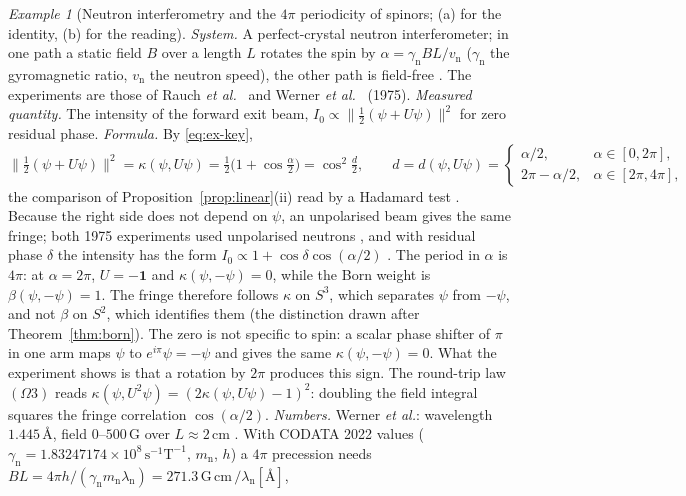 \documentclass[aps,pra,onecolumn,superscriptaddress,nofootinbib,10pt]{revtex4-2}
\theoremstyle{definition}
\theoremstyle{remark}
\newtheorem{example}[theorem]{Example}
\begin{document}
\begin{example}[Neutron interferometry and the $4\pi$ periodicity of spinors; (a) for the identity, (b) for the reading]\label{ex:neutron}
\emph{System.}  A perfect-crystal neutron interferometer; in one path a static field $B$ over a length
$L$ rotates the spin by $\alpha=\gamma_{\mathrm n}BL/v_{\mathrm n}$ ($\gamma_{\mathrm n}$ the gyromagnetic ratio, $v_{\mathrm n}$ the
neutron speed), the other path is field-free \cite{ex-AS67,ex-Bernstein67}.  The experiments are those of
Rauch \emph{et al.}\ \cite{ex-Rauch75} and Werner \emph{et al.}\ \cite{ex-WCOE75} (1975).
\emph{Measured quantity.}  The intensity of the forward exit beam, $I_0\propto\lVert\tfrac12(\psi+U\psi)\rVert^2$ for
zero residual phase.
\emph{Formula.}  By \eqref{eq:ex-key},
\[
\lVert\tfrac12(\psi+U\psi)\rVert^2=\kappa(\psi,U\psi)=\tfrac12\bigl(1+\cos\tfrac\alpha2\bigr)=\cos^2\tfrac{d}{2},\qquad d=d(\psi,U\psi)=\begin{cases}\alpha/2,&\alpha\in[0,2\pi],\\2\pi-\alpha/2,&\alpha\in[2\pi,4\pi],\end{cases}
\]
the comparison of Proposition~\ref{prop:linear}(ii) read by a Hadamard test \cite{ex-CEMM98,AJL}.  Because the
right side does not depend on $\psi$, an unpolarised beam gives the same fringe; both 1975 experiments
used unpolarised neutrons \cite{ex-WCOE75,ex-Rauch88}, and with residual phase $\delta$ the intensity has
the form $I_0\propto1+\cos\delta\cos(\alpha/2)$ \cite{ex-WCOE75}.  The period in $\alpha$ is $4\pi$: at $\alpha=2\pi$,
$U=-\mathbf1$ and $\kappa(\psi,-\psi)=0$, while the Born weight is $\beta(\psi,-\psi)=1$.  The fringe therefore
follows $\kappa$ on $S^3$, which separates $\psi$ from $-\psi$, and not $\beta$ on $S^2$, which identifies them
(the distinction drawn after Theorem~\ref{thm:born}).  The zero is not specific to spin: a scalar
phase shifter of $\pi$ in one arm maps $\psi$ to $e^{i\pi}\psi=-\psi$ and gives the same $\kappa(\psi,-\psi)=0$.  What
the experiment shows is that a rotation by $2\pi$ produces this sign.  The round-trip law $(\Omega3)$ reads
$\kappa(\psi,U^2\psi)=(2\kappa(\psi,U\psi)-1)^2$: doubling the field integral squares the fringe correlation
$\cos(\alpha/2)$.
\emph{Numbers.}  Werner \emph{et al.}: wavelength $1.445$\,\AA, field $0$--$500$\,G over $L\approx2$\,cm
\cite{ex-WCOE75}.  With CODATA 2022 values \cite{ex-CODATA22} ($\gamma_{\mathrm n}=1.83247174\times10^{8}\,\mathrm{s^{-1}T^{-1}}$,
$m_{\mathrm n}$, $h$) a $4\pi$ precession needs $BL=4\pi h/(\gamma_{\mathrm n}m_{\mathrm n}\lambda_{\mathrm n})=271.3\,\mathrm{G\,cm}\,/\lambda_{\mathrm n}[\text{\AA}]$,

\end{example}
\end{document}
